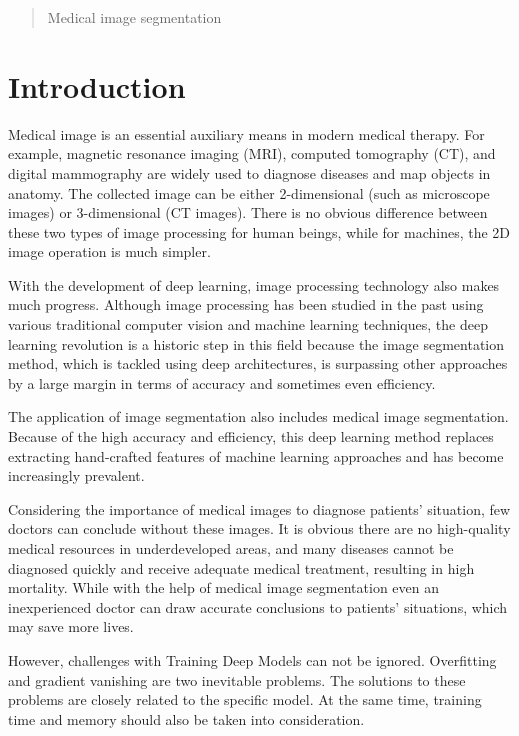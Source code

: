 \documentclass{article}
\begin{document}
\setlength{\parindent}{2em}



\begin{abstract}
    Medical image segmentation
\end{abstract}

\section{Introduction}

Medical image is an essential auxiliary means in modern medical therapy.
For example, magnetic resonance imaging (MRI), computed tomography (CT), and digital mammography are widely used to diagnose diseases and map objects in anatomy.\cite{pham2000current}
The collected image can be either 2-dimensional (such as microscope images) or 3-dimensional (CT images).
There is no obvious difference between these two types of image processing for human beings, while for machines, the 2D image operation is much simpler.

With the development of deep learning, image processing technology also makes much progress.
Although image processing has been studied in the past using various traditional computer vision and machine learning techniques, the deep learning revolution is a historic step in this field because the image segmentation method, which is tackled using deep architectures, is surpassing other approaches by a large margin in terms of accuracy and sometimes even efficiency.\cite{DBLP:journals/corr/Garcia-GarciaOO17}

The application of image segmentation also includes medical image segmentation.
Because of the high accuracy and efficiency, this deep learning method replaces extracting hand-crafted features of machine learning approaches and has become increasingly prevalent.\cite{hesamian2019deep}

Considering the importance of medical images to diagnose patients' situation, few doctors can conclude without these images.
It is obvious there are no high-quality medical resources in underdeveloped areas, and many diseases cannot be diagnosed quickly and receive adequate medical treatment, resulting in high mortality.
While with the help of medical image segmentation even an inexperienced doctor can draw accurate conclusions to patients' situations, which may save more lives.

However, challenges with Training Deep Models can not be ignored.
Overfitting and gradient vanishing are two inevitable problems.
The solutions to these problems are closely related to the specific model.
At the same time, training time and memory should also be taken into consideration.
\end{document}
